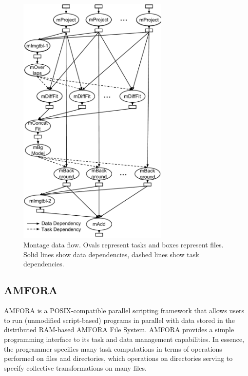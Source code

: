 \documentclass{sig-alternate}
\begin{document}
\begin{figure}[h]
\begin{center}
    \includegraphics[width=75mm]{pictures/montage}
\caption {Montage data flow. Ovals represent tasks and boxes represent files. Solid lines show data dependencies, dashed lines show task dependencies.
    \label{fig:montage-flow}
}
\end{center}
\end{figure}



\subsection{AMFORA}

AMFORA is a POSIX-compatible parallel scripting framework that allows users to run (unmodified script-based) 
programs in parallel with data stored in the distributed RAM-based AMFORA File System.  
AMFORA provides a simple programming interface to its task and data management capabilities.
In essence, the programmer specifies many task computations in terms of operations performed on files and directories,
which operations on directories serving to specify collective transformations on many files.
\end{document}
